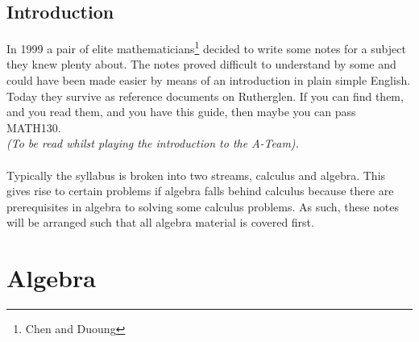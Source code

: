 %
\maketitle
%
%
\section{Introduction}
\label{sec:Introduction}
In 1999 a pair of elite mathematicians\footnote{Chen and Duoung} decided to
write some notes for a subject they knew plenty about. The notes proved
difficult to understand by some and could have been made easier by means of an
introduction in plain simple English. Today they survive as reference documents
on Rutherglen. If you can find them, and you read them, and you have this
guide, then maybe you can pass MATH130.\\
\emph{(To be read whilst playing the introduction to the A-Team).}\\
\\
Typically the syllabus is broken into two streams, calculus and algebra. This
gives rise to certain problems if algebra falls behind calculus because
there are prerequisites in algebra to solving some calculus problems. As such,
these notes will be arranged such that all algebra material is covered first.
\tableofcontents
%
\newpage
\chapter{Algebra}
\label{chap:Algebra}
